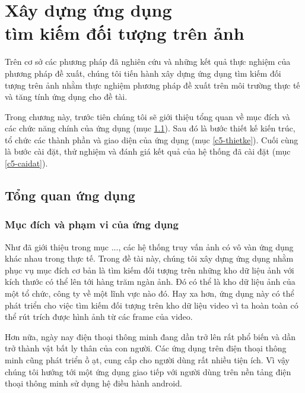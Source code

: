 \chapter{Xây dựng ứng dụng\\tìm kiếm đối tượng trên ảnh}
\label{chapter:application}
\ifpdf
    \graphicspath{{Chapter5/Chapter5Figs/PNG/}{Chapter5/Chapter5Figs/PDF/}{Chapter5/Chapter5Figs/}}
\else
    \graphicspath{{Chapter5/Chapter5Figs/EPS/}{Chapter5/Chapter5Figs/}}
\fi
{}

Trên cơ sở các phương pháp đã nghiên cứu và những kết quả thực nghiệm của phương pháp đề xuất, chúng tôi tiến hành xây dựng ứng dụng tìm kiếm đối tượng trên ảnh nhằm thực nghiệm phương pháp đề xuất trên môi trường thực tế và tăng tính ứng dụng cho đề tài.

Trong chương này, trước tiên chúng tôi sẽ giới thiệu tổng quan về mục đích và các chức năng chính của ứng dụng (mục \ref{c5-tongquan}). Sau đó là bước thiết kế kiến trúc, tổ chức các thành phần và giao diện của ứng dụng (mục \ref{c5-thietke}). Cuối cùng là bước cài đặt, thử nghiệm và đánh giá kết quả của hệ thống đã cài đặt (mục \ref{c5-caidat}).

\section{Tổng quan ứng dụng}
\label{c5-tongquan}

	\subsection{Mục đích và phạm vi của ứng dụng}
Như đã giới thiệu trong mục ..., các hệ thống truy vấn ảnh có vô vàn ứng dụng khác nhau trong thực tế. Trong đề tài này, chúng tôi xây dựng ứng dụng nhằm phục vụ mục đích cơ bản là tìm kiếm đối tượng trên những kho dữ liệu ảnh với kích thước có thể lên tới hàng trăm ngàn ảnh. Đó có thể là kho dữ liệu ảnh của một tổ chức, công ty về một lĩnh vực nào đó. Hay xa hơn, ứng dụng này có thể phát triển cho việc tìm kiếm đối tượng trên kho dữ liệu video vì ta hoàn toàn có thể rút trích được hình ảnh từ các frame của video.

Hơn nữa, ngày nay điện thoại thông minh đang dần trở lên rất phổ biến và dần trở thành vật bất ly thân của con người. Các ứng dụng trên điện thoại thông minh cũng phát triển ồ ạt, cung cấp cho người dùng rất nhiều tiện ích. Vì vậy chúng tôi hướng tới một ứng dụng giao tiếp với người dùng trên nền tảng điện thoại thông minh sử dụng hệ điều hành android.
	
